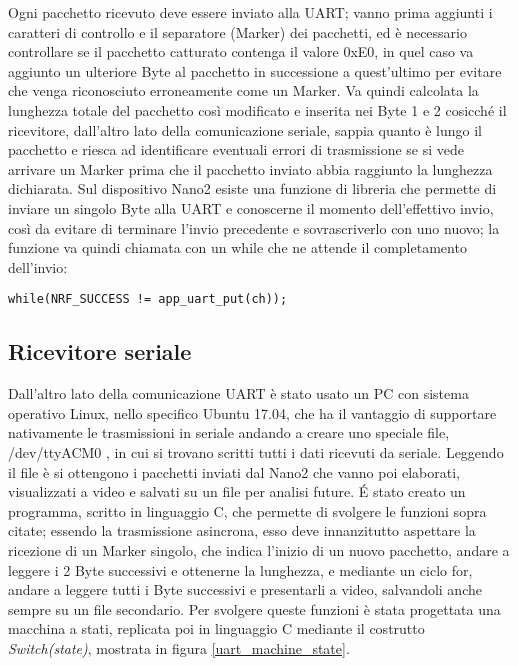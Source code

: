 Ogni pacchetto ricevuto deve essere inviato alla UART; vanno prima aggiunti i caratteri di controllo e il separatore (Marker) dei pacchetti, ed è necessario controllare se il pacchetto catturato contenga il valore 0xE0, in quel caso va aggiunto un ulteriore Byte al pacchetto in successione a quest'ultimo per evitare che venga riconosciuto erroneamente come un Marker. Va quindi calcolata la lunghezza totale del pacchetto così modificato e inserita nei Byte 1 e 2  cosicché il ricevitore, dall'altro lato della comunicazione seriale, sappia quanto è lungo il pacchetto e riesca ad identificare eventuali errori di trasmissione se si vede arrivare un Marker prima che il pacchetto inviato abbia raggiunto la lunghezza dichiarata.
Sul dispositivo Nano2 esiste una funzione di libreria che permette di inviare un singolo Byte alla UART e conoscerne il momento dell'effettivo invio, così da evitare di terminare l'invio precedente e sovrascriverlo con uno nuovo; la funzione va quindi chiamata con un while che ne attende il completamento dell'invio:

\begin{verbatim}
while(NRF_SUCCESS != app_uart_put(ch)); 
\end{verbatim}

\subsection{Ricevitore seriale}
Dall'altro lato della comunicazione UART è stato usato un PC con sistema operativo Linux, nello specifico Ubuntu 17.04, che ha il vantaggio di supportare nativamente le trasmissioni in seriale andando a creare uno speciale file, /dev/ttyACM0 , in cui si trovano scritti tutti i dati ricevuti da seriale. Leggendo il file è si ottengono i pacchetti inviati dal Nano2 che vanno poi elaborati, visualizzati a video e salvati su un file per analisi future.
\'E stato creato un programma, scritto in linguaggio C, che permette di svolgere le funzioni sopra citate; essendo la trasmissione asincrona, esso deve innanzitutto aspettare la ricezione di un Marker singolo, che indica l'inizio di un nuovo pacchetto, andare a leggere i 2 Byte successivi e ottenerne la lunghezza, e mediante un ciclo for, andare a leggere tutti i Byte successivi e presentarli a video, salvandoli anche sempre su un file secondario.
Per svolgere queste funzioni è stata progettata una macchina a stati, replicata poi in linguaggio C mediante il costrutto \emph{Switch(state)}, mostrata in figura \ref{uart_machine_state}.


